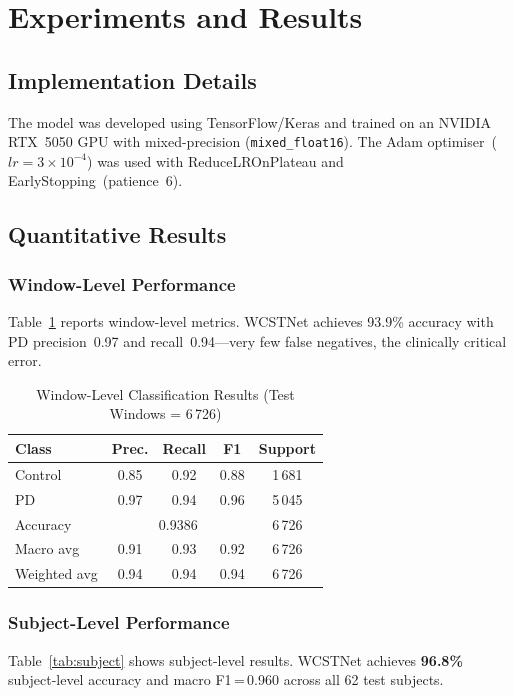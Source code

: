 \documentclass[lettersize,journal]{IEEEtran}
\begin{document}
\section{Experiments and Results}
\label{sec:results}

\subsection{Implementation Details}
The model was developed using TensorFlow/Keras and trained on an
NVIDIA RTX~5050 GPU with mixed-precision
(\texttt{mixed\_float16}).
The Adam optimiser~($lr = 3\!\times\!10^{-4}$) was used with
ReduceLROnPlateau and EarlyStopping~(patience~6).

\subsection{Quantitative Results}

\subsubsection{Window-Level Performance}
Table~\ref{tab:window} reports window-level metrics.
WCSTNet achieves 93.9\% accuracy with PD precision~0.97 and
recall~0.94—very few false negatives, the clinically critical error.

\begin{table}[!t]
\caption{Window-Level Classification Results
(Test Windows = 6\,726)}
\label{tab:window}
\centering
\renewcommand{\arraystretch}{1.2}
\begin{tabular}{lcccc}
\toprule
\textbf{Class} & \textbf{Prec.} & \textbf{Recall} & \textbf{F1}
& \textbf{Support} \\
\midrule
Control & 0.85 & 0.92 & 0.88 & 1\,681 \\
PD      & 0.97 & 0.94 & 0.96 & 5\,045 \\
\midrule
Accuracy    & \multicolumn{3}{c}{0.9386} & 6\,726 \\
Macro avg   & 0.91 & 0.93 & 0.92 & 6\,726 \\
Weighted avg& 0.94 & 0.94 & 0.94 & 6\,726 \\
\bottomrule
\end{tabular}
\end{table}

\subsubsection{Subject-Level Performance}
Table~\ref{tab:subject} shows subject-level results.
WCSTNet achieves \textbf{96.8\%} subject-level accuracy and macro
F1\,=\,0.960 across all 62 test subjects.
\end{document}
